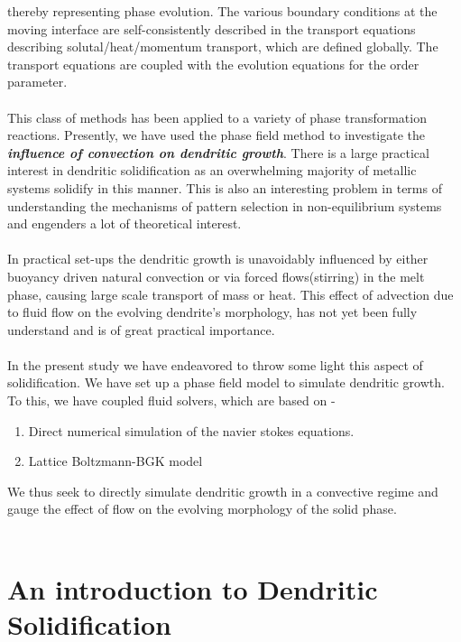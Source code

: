 \documentclass[12pt,a4paper]{report}
\begin{document}
thereby representing phase evolution. The various boundary
conditions at the moving interface are self-consistently
described in the transport equations describing
solutal/heat/momentum transport, which are defined globally. 
The transport equations are coupled with the evolution equations
for the order parameter.\\
\\
This class of methods has been applied to a variety of phase transformation reactions.
Presently, we have used the phase field method to investigate the 
\textbf{\textit{influence of convection on dendritic growth}}. There is a large 
practical interest in dendritic solidification as an overwhelming majority of 
metallic systems solidify in this manner. This is also an interesting problem 
in terms of 
understanding the mechanisms of pattern selection in non-equilibrium systems and engenders a lot of theoretical 
interest.\\
\\ 
In practical set-ups the dendritic growth is unavoidably influenced by either buoyancy driven natural convection or via forced flows(stirring) in the melt phase, causing large scale transport of mass or heat. This effect of advection due to fluid flow on the evolving dendrite's morphology, has not yet been fully understand and is of great practical importance.\\ 
\\
In the present study we have endeavored to throw some light this aspect of solidification. We have set up a phase field model to simulate dendritic growth. To this, we have coupled fluid solvers, which are based on - 
\begin{enumerate}
	\item Direct numerical simulation of the navier stokes equations.
	\item Lattice Boltzmann-BGK model
\end{enumerate} 
We thus seek to directly simulate dendritic growth in a convective regime and gauge the effect of flow on the evolving morphology of the solid phase.\\
\\
\chapter{An introduction to Dendritic Solidification}
\end{document}
